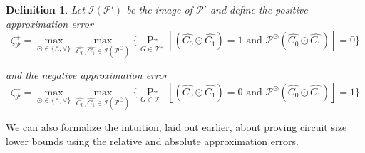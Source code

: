 \documentclass[10pt,a4paper]{article}
\newtheorem{definition}[theorem]{Definition}
\newtheorem{lemma}[theorem]{Lemma}
\begin{document}
\begin{definition}
\label{def:one-step-errors}
    Let $\mathcal{I}(\mathcal{P}')$ be the image of $\mathcal{P}'$ and define the positive approximation error
    \begin{equation*}
        \zeta^+_{\mathcal{P}} = \max_{\odot \in \{\wedge, \vee\}} \max_{\hat{C_0}, \hat{C_1} \in \mathcal{I}(\mathcal{P}^\odot)} \{ \Pr_{G \in \mathcal{T}^+}[(\hat{C_0} \odot \hat{C_1})=1 \text{ and } \mathcal{P}^{\odot}(\hat{C_0} \odot \hat{C_1})] = 0 \}
    \end{equation*}

    and the negative approximation error 
    \begin{equation*}
        \zeta^-_{\mathcal{P}} = \max_{\odot \in \{\wedge, \vee\}} \max_{\hat{C_0}, \hat{C_1} \in \mathcal{I}(\mathcal{P}^\odot)} \{ \Pr_{G \in \mathcal{T}^-}[(\hat{C_0} \odot \hat{C_1})=0 \text{ and } \mathcal{P}^\odot(\hat{C_0} \odot \hat{C_1})] = 1 \}
    \end{equation*}

\end{definition}


We can also formalize the intuition, laid out earlier, about proving circuit size lower bounds using the relative and absolute approximation errors.
\end{document}
